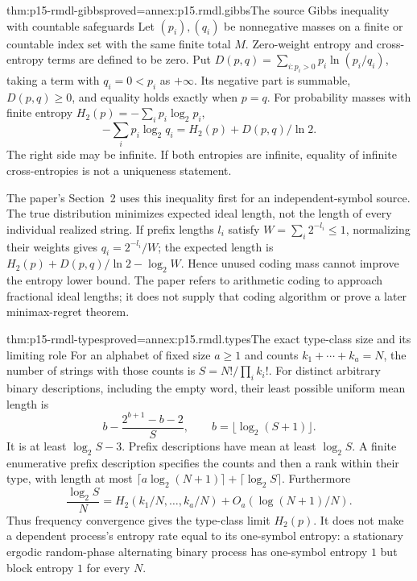 \begin{hbtheorem}{thm:p15-rmdl-gibbs}{proved=annex:p15.rmdl.gibbs}{The source Gibbs inequality with countable safeguards}
Let \((p_i),(q_i)\) be nonnegative masses on a finite or countable index
set with the same finite total \(M\). Zero-weight entropy and
cross-entropy terms are defined to be zero. Put
\(D(p,q)=\sum_{i:p_i>0}p_i\ln(p_i/q_i)\), taking a term with
\(q_i=0<p_i\) as \(+\infty\). Its negative part is summable,
\(D(p,q)\geq0\), and equality holds exactly when \(p=q\).
For probability masses with finite entropy
\(H_2(p)=-\sum_i p_i\log_2p_i\),
\[
 -\sum_i p_i\log_2q_i=H_2(p)+D(p,q)/\ln2.
\]
The right side may be infinite. If both entropies are infinite, equality
of infinite cross-entropies is not a uniqueness statement.
\end{hbtheorem}

The paper's Section~2 uses this inequality first for an independent-symbol
source. The true distribution minimizes expected ideal length, not the
length of every individual realized string. If prefix lengths \(l_i\)
satisfy \(W=\sum_i2^{-l_i}\leq1\), normalizing their weights gives
\(q_i=2^{-l_i}/W\); the expected length is
\(H_2(p)+D(p,q)/\ln2-\log_2W\). Hence unused coding mass cannot
improve the entropy lower bound. The paper refers to arithmetic coding to
approach fractional ideal lengths; it does not supply that coding algorithm
or prove a later minimax-regret theorem.

\begin{hbtheorem}{thm:p15-rmdl-types}{proved=annex:p15.rmdl.types}{The exact type-class size and its limiting role}
For an alphabet of fixed size \(a\geq1\) and counts
\(k_1+\cdots+k_a=N\), the number of strings with those counts is
\(S=N!/\prod_i k_i!\). For distinct arbitrary binary descriptions,
including the empty word, their least possible uniform mean length is
\[
 b-\frac{2^{b+1}-b-2}{S},\qquad b=\lfloor\log_2(S+1)\rfloor.
\]
It is at least \(\log_2S-3\). Prefix descriptions have mean at least
\(\log_2S\). A finite enumerative prefix description specifies the
counts and then a rank within their type, with length at most
\(\lceil a\log_2(N+1)\rceil+\lceil\log_2S\rceil\).
Furthermore
\[
 \frac{\log_2S}{N}
 =H_2(k_1/N,\ldots,k_a/N)+O_a(\log(N+1)/N).
\]
Thus frequency convergence gives the type-class limit \(H_2(p)\).
It does not make a dependent process's entropy rate equal to its one-symbol
entropy: a stationary ergodic random-phase alternating binary process has
one-symbol entropy \(1\) but block entropy \(1\) for every \(N\).
\end{hbtheorem}

